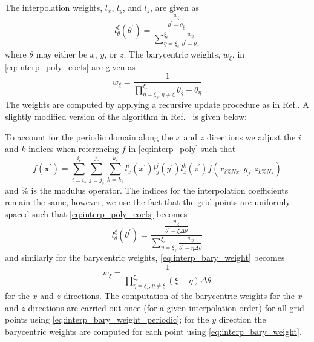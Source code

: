 \documentclass[11pt]{article}
\begin{document}
The interpolation weights, $l_x$, $l_y$, and $l_z$, are given as
\begin{equation}\label{eq:interp_poly_coefs}
  l_\theta^\xi(\theta^\prime) = \frac{\frac{w_\xi}{\theta^\prime - \theta_\xi}}{\sum_{\eta=\xi_s}^{\xi_e} \frac{w_{\eta}}{\theta^\prime - \theta_\eta} }
\end{equation}
where $\theta$ may either be $x$, $y$, or $z$. The barycentric weights, $w_\xi$, in \eqref{eq:interp_poly_coefs} are given as
\begin{equation}\label{eq:interp_bary_weight}
  w_\xi = \frac{1}{\prod_{\eta=\xi_s,\eta\neq \xi}^{\xi_e} \theta_\xi - \theta_\eta}
\end{equation}
The weights are computed by applying a recursive update procedure as in Ref.\cite{Berrut2004}. A slightly modified version of the algorithm in Ref.~\cite{Berrut2004} is given below:
\begin{algorithmic}
  \ENDFOR
  \ENDFOR
  \ENDFOR
  \ENDFOR
\end{algorithmic}

To account for the periodic domain along the $x$ and $z$ directions we adjust the $i$ and $k$ indices when referencing $f$ in \eqref{eq:interp_poly} such that
\begin{equation}
  f(\bm{x}^\prime) = \sum_{i=i_s}^{i_e}\sum_{j=j_s}^{j_e}\sum_{k=k_s}^{k_e}  l_x^{i}(x^\prime) l_y^{j}(y^\prime) l_z^{k}(z^\prime)f(x_{i\%Nx}, y_{j}, z_{k\%Nz})
\end{equation}
and $\%$ is the modulus operator. The indices for the interpolation coefficients remain the same, however, we use the fact that the grid points are uniformly spaced such that \eqref{eq:interp_poly_coefs} becomes
\begin{equation}
  l_\theta^\xi(\theta^\prime) = \frac{\frac{w_\xi}{\theta^\prime - \xi \Delta\theta}}{\sum_{\eta=\xi_s}^{\xi_e} \frac{w_{\eta}}{\theta^\prime - \eta \Delta\theta} }
\end{equation}
and similarly for the barycentric weights, \eqref{eq:interp_bary_weight} becomes
\begin{equation}\label{eq:interp_bary_weight_periodic}
  w_\xi = \frac{1}{\prod_{\eta=\xi_s,\eta\neq \xi}^{\xi_e} (\xi - \eta)\Delta\theta}
\end{equation}
for the $x$ and $z$ directions. The computation of the barycentric weights for the $x$ and $z$ directions are carried out once (for a given interpolation order) for all grid points using \eqref{eq:interp_bary_weight_periodic}; for the $y$ direction the barycentric weights are computed for each point using \eqref{eq:interp_bary_weight}.
\end{document}
